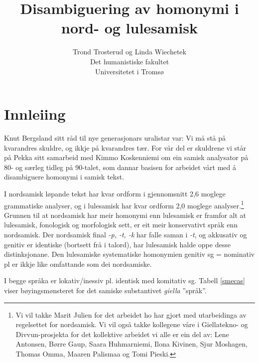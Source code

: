 \documentclass[a4paper,norsk]{article}
\begin{document}
\title{Disambiguering av homonymi i nord- og lulesamisk}

\author{Trond Trosterud og Linda Wiechetek\\
Det humanistiske fakultet\\
Universitetet i Tromsø}

\maketitle



\section{Innleiing} 


Knut Bergsland sitt råd til nye generasjonars uralistar var: Vi må stå på kvarandres skuldre, og ikkje på kvarandres tær. For vår del er skuldrene vi står på Pekka sitt samarbeid med Kimmo Koskenniemi om ein samisk analysator på 80- og særleg tidleg på 90-talet, som dannar basisen for arbeidet vårt med å disambiguere homonymi i samisk tekst.  

I nordsamisk løpande tekst har kvar ordform i gjennomsnitt 2,6 moglege grammatiske analyser, og i lulesamisk har kvar ordform 2,0 moglege analyser.\footnote{Vi vil takke Marit Julien for det arbeidet ho har gjort med utarbeidinga av regelsettet for nordsamisk. Vi vil også takke kollegene våre i Giellatekno- og Divvun-prosjekta for det kollektive arbeidet vi alle er ein del av: Lene Antonsen, Børre Gaup, Saara Huhmarniemi, Ilona Kivinen, Sjur Moshagen, Thomas Omma, Maaren Palismaa og Tomi Pieski. } Grunnen til at nordsamisk har meir homonymi enn lulesamisk er framfor alt at lulesamisk, fonologisk og morfologisk sett, er eit meir konservativt språk enn nordsamisk. Der nordsamisk final \textit{-p, -t, -k} har falle saman i \textit{-t}, og akkusativ og genitiv er identiske (bortsett frå i talord), har lulesamisk halde oppe desse distinksjonane. Den lulesamiske systematiske homonymien genitiv sg = nominativ pl er ikkje like omfattande som dei nordsamiske. %

I begge språka er lokativ/inessiv pl. identisk med komitativ sg. Tabell \ref{smecas}  viser bøyingsmønsteret for det samiske substantivet \textit{giella} ''språk''.%
\end{document}
